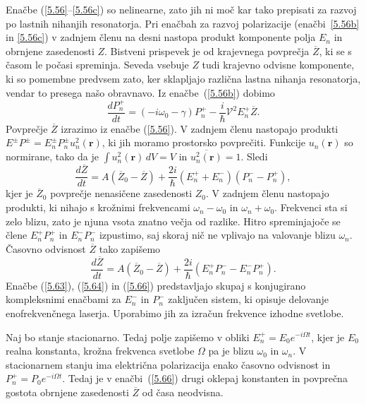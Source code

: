 Enačbe (\ref{5.56}--\ref{5.56c}) so nelinearne, zato jih ni moč kar tako
prepisati za razvoj po lastnih nihanjih resonatorja. Pri enačbah za
razvoj polarizacije (enačbi~\ref{5.56b} in \ref{5.56c}) v zadnjem členu na desni 
nastopa produkt komponente polja $E_n$ in obrnjene zasedenosti $Z$. Bistveni
prispevek je od krajevnega povprečja $\overline{Z}$, ki se s časom le počasi spreminja.
Seveda vsebuje $Z$ tudi krajevno odvisne komponente, ki so pomembne 
predvsem zato, ker sklapljajo različna lastna nihanja resonatorja, vendar to
presega našo obravnavo. Iz enačbe~(\ref{5.56b}) dobimo
\begin{equation}  
\label{5.64}
\frac{d P_n^+}{dt}=\left(-i \omega_0-\gamma\right)P_n^{+}-\frac{i}{\hslash}
\mathcal{V}^2 E_n^+ \overline{Z}.
\end{equation}
Povprečje $\overline{Z}$ izrazimo iz enačbe (\ref{5.56}). V zadnjem členu nastopajo produkti 
$E^{\pm}P^{\pm}=E_n^{\pm}P_n^{\pm} u_n^2\left(\mathbf{r}\right)$,
ki jih moramo prostorsko povprečiti. Funkcije $u_n\left(\mathbf{r}\right)$ so
normirane, tako da je $\int u_n^2\left(\mathbf{r}\right) \,dV=V$ in $\overline{u_n^2\left(\mathbf{r}\right)}=1$.
Sledi
\begin{equation}  
\label{5.65}
\frac{d\overline{Z}}{dt}= A\left(\overline{Z}_0-\overline{Z}\right)+ \frac{2i}{\hslash}\left(E_n^+
+E_n^-\right)\left(P_n^- - P_n^+\right),
\end{equation}
kjer je $\overline{Z}_0$ povprečje nenasičene zasedenosti $Z_0$. V zadnjem
členu nastopajo produkti, ki nihajo s krožnimi frekvencami $\omega_n-
\omega_0$ in $\omega_n+ \omega_0$. Frekvenci sta si zelo blizu,
zato je njuna vsota znatno večja od razlike. Hitro spreminjajoče se člene 
$E_n^+P_n^+$ in $E_n^- P_n^-$ izpustimo, 
saj skoraj nič ne vplivajo na valovanje blizu $\omega_n$. Časovno odvisnost 
$\overline{Z}$ tako zapišemo 
\begin{equation}  
\label{5.66}
\frac{d\overline{Z}}{dt}= A\left(\overline{Z}_0-\overline{Z}\right)+\frac{2i}{\hslash}\left(E_n^+
P_n^- - E_n^- P_n^+\right).
\end{equation}
Enačbe (\ref{5.63}), (\ref{5.64}) in (\ref{5.66}) predstavljajo skupaj s konjugirano
kompleksnimi enačbami za $E_n^-$ in $P_n^-$ zaključen
sistem, ki opisuje delovanje enofrekvenčnega laserja. Uporabimo jih za
izračun frekvence izhodne svetlobe.

Naj bo stanje stacionarno. Tedaj polje zapišemo v obliki $E_{n
}^{+}=E_{0}e^{-i\Omega t}$, kjer je $E_{0}$ realna konstanta, krožna frekvenca
svetlobe $\Omega$ pa je blizu $\omega _{0}$ in $\omega _{n }$. V
stacionarnem stanju ima električna polarizacija enako časovno odvisnost in 
$P_{n }^{+}=P_{0}e^{-i\Omega t}$. Tedaj je v enačbi~(\ref{5.66}) drugi
oklepaj konstanten in povprečna gostota obrnjene zasedenosti $\overline{Z}$ 
od časa neodvisna. 

